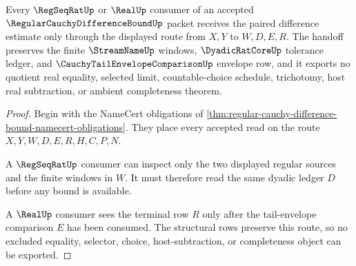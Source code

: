 \begin{theorem}
\label{thm:regular-cauchy-difference-bound-regseqrat-handoff}
Every $\RegSeqRatUp$ or $\RealUp$ consumer of an accepted $\RegularCauchyDifferenceBoundUp$ packet receives the paired difference estimate only through the displayed route from $X,Y$ to $W,D,E,R$. The handoff preserves the finite $\StreamNameUp$ windows, $\DyadicRatCoreUp$ tolerance ledger, and $\CauchyTailEnvelopeComparisonUp$ envelope row, and it exports no quotient real equality, selected limit, countable-choice schedule, trichotomy, host real subtraction, or ambient completeness theorem.
\end{theorem}
\begin{proof}
Begin with the NameCert obligations of \autoref{thm:regular-cauchy-difference-bound-namecert-obligations}. They place every accepted read on the route $X,Y,W,D,E,R,H,C,P,N$.

A $\RegSeqRatUp$ consumer can inspect only the two displayed regular sources and the finite windows in $W$. It must therefore read the same dyadic ledger $D$ before any bound is available.

A $\RealUp$ consumer sees the terminal row $R$ only after the tail-envelope comparison $E$ has been consumed. The structural rows preserve this route, so no excluded equality, selector, choice, host-subtraction, or completeness object can be exported.
\end{proof}




